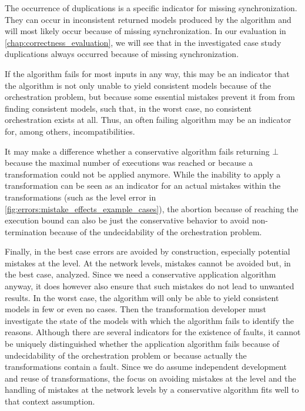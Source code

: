 The occurrence of duplications is a specific indicator for missing synchronization.
They can occur in inconsistent returned models produced by the algorithm and will most likely occur because of missing synchronization.
In our evaluation in \autoref{chap:correctness_evaluation}, we will see that in the investigated case study duplications always occurred because of missing synchronization.

If the algorithm fails for most inputs in any way, this may be an indicator that the algorithm is not only unable to yield consistent models because of the orchestration problem, but because some essential mistakes prevent it from from finding consistent models, such that, in the worst case, no consistent orchestration exists at all.
Thus, an often failing algorithm may be an indicator for, among others, incompatibilities.

It may make a difference whether a conservative algorithm fails returning $\bot$ because the maximal number of executions was reached or because a transformation could not be applied anymore.
While the inability to apply a transformation can be seen as an indicator for an actual mistakes within the transformations (such as the \levelnetworkrelation level error in \autoref{fig:errors:mistake_effects_example_cases}), the abortion because of reaching the execution bound can also be just the conservative behavior to avoid non-termination because of the undecidability of the orchestration problem.

Finally, in the best case errors are avoided by construction, especially potential mistakes at the \leveltransformation level.
At the network levels, mistakes cannot be avoided but, in the best case, analyzed.
Since we need a conservative application algorithm anyway, it does however also ensure that such mistakes do not lead to unwanted results.
In the worst case, the algorithm will only be able to yield consistent models in few or even no cases.
Then the transformation developer must investigate the state of the models with which the algorithm fails to identify the reasons.
Although there are several indicators for the existence of faults, it cannot be uniquely distinguished whether the application algorithm fails because of undecidability of the orchestration problem or because actually the transformations contain a fault.
Since we do assume independent development and reuse of transformations, the focus on avoiding mistakes at the \leveltransformation level and the handling of mistakes at the network levels by a conservative algorithm fits well to that context assumption.


